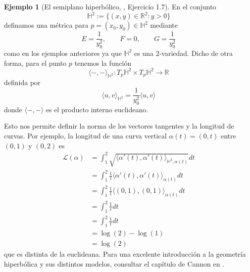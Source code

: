 \documentclass[spanish]{book}
\theoremstyle{definition}
\newtheorem*{ejem}{Ejemplo}
\newcommand{\R}{\mathbb{R}}
\newcommand{\Hy}{\mathbb{H}}
\begin{document}
	\begin{ejem}[El semiplano hiperbólico, \cite{seade}, \cite{Loring-dif} Ejercicio 1.7]
		En el conjunto
		\[\Hy^2:=\{(x,y)\in\R^2:y>0\}\]
		definamos una métrica para $p=(x_0,y_0)\in\Hy^2$ mediante
		\[E=\frac{1}{y^2_0},\qquad F=0,\qquad G=\frac{1}{y^2_0}\]
		como en los ejemplos anteriores ya que $\Hy^2$ es una 2-variedad. Dicho de otra forma, para el punto $p$ tenemos la función
			\[\langle-,-\rangle_{\Hy^2}:T_p\Hy^2\times T_p\Hy^2\to\R\]
		definida por
		\[\langle u,v\rangle_{\Hy^2}=\frac{1}{y_0^2}\langle u,v\rangle\]
		donde $\langle -,-\rangle$ es el producto interno euclideano.

		Esto nos permite definir la norma de los vectores tangentes y la longitud de curvas. Por ejemplo, la longitud de una curva vertical $\alpha(t)=(0,t)$ entre $(0,1)$ y $(0,2)$ es
		\begin{align*}
			\mathcal{L}(\alpha)&=\int_1^2\sqrt{\langle \alpha'(t),\alpha'(t)\rangle_{\Hy^2,\alpha(t)}}dt\\
			&=\int_1^2 \frac{1}{t}\langle \alpha'(t),\alpha'(t)\rangle_{\alpha(t)}dt\\
			&=\int_1^2\frac{1}{t}\langle (0,1),(0,1)\rangle_{\alpha(t)}dt\\
			&=\int_1^2\frac{1}{t}dt\\
			&=\int_1^2\frac{1}{t}dt\\
			&=\log(2)-\log(1)\\
			&=\log(2)
		\end{align*}
		que es distinta de la euclideana. Para una excelente introducción a la geometría hiperbólica y sus distintos modelos, consultar el capítulo de Cannon en \cite{flavors}.
	\end{ejem}
	
\end{document}

